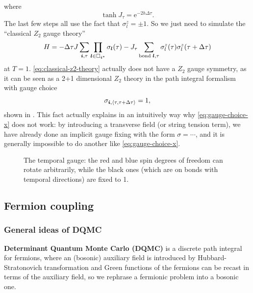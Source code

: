 \documentclass[hyperref, a4paper]{article}
\newcommand*{\ee}{\mathrm{e}}
\newcommand*{\pair}[1]{\langle #1 \rangle}
\newcommand*{\concept}[1]{{\textbf{#1}}}
\newcommand*{\Ztwo}{\texorpdfstring{$\mathbb{Z}_2$ }{Z2 }}
\def\mathbb#1{#1}%
\begin{document}
where 
\begin{equation}
    \tanh J_\tau = \ee^{-2 h \Delta \tau}.
\end{equation}
The last few steps all use the fact that $\sigma^z_l = \pm 1$.
So we just need to simulate the ``classical \Ztwo gauge theory''
\begin{equation}
    H = - \Delta \tau J \sum_{\vb*{i}, \tau} \prod_{\vb*{l} \in \Box_{\vb*{i}^*}} \sigma_{\vb*{l}}(\tau) 
    - J_\tau \sum_{\text{bond $\vb*{l}$}, \tau} \sigma_l^z(\tau) \sigma_l^z(\tau + \Delta \tau)
    \label{eq:classical-z2-theory}
\end{equation}
at $T = 1$. \eqref{eq:classical-z2-theory} actually does not have a \Ztwo gauge symmetry, as it can be seen as a 2+1 dimensional \Ztwo theory in the path integral formalism with gauge choice
\begin{equation}
    \sigma_{\vb*{i}, \pair{\tau, \tau + \Delta \tau}} = 1,
\end{equation}
shown in .
This fact actually explains in an intuitively way why \eqref{eq:gauge-choice-x} does not work:
by introducing a transverse field (or string tension term), we have already done an implicit gauge fixing with the form $\sigma=\cdots$, and it is generally impossible to do another like \eqref{eq:gauge-choice-x}.

\begin{figure}
    \centering
    
    \caption{The temporal gauge: the red and blue spin degrees of freedom can rotate arbitrarily, while the black ones (which are on bonds with temporal directions) are fixed to 1. }
    \label{fig:temporal-gauge}
\end{figure}

\subsection{Fermion coupling}

\subsubsection{General ideas of DQMC}

\concept{Determinant Quantum Monte Carlo (DQMC)} is a discrete path integral for fermions, 
where an (bosonic) auxiliary field is introduced by Hubbard-Stratonovich transformation and Green functions of the fermions can be recast in terms of the auxiliary field, so we rephrase a fermionic problem into a bosonic one.
\end{document}
